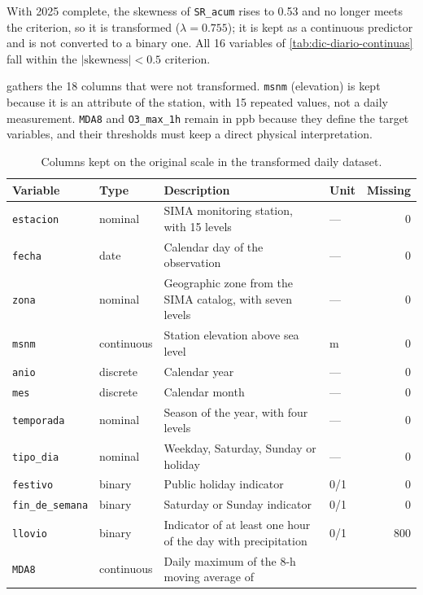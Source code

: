 With 2025 complete, the skewness of \texttt{SR\_acum} rises to 0.53 and no
longer meets the criterion, so it is transformed ($\lambda=0.755$); it is
kept as a continuous predictor and is not converted to a binary one. All 16
variables of \cref{tab:dic-diario-continuas} fall within the
$|\mathrm{skewness}|<0.5$ criterion.

 gathers the 18 columns that were not
transformed. \texttt{msnm} (elevation) is kept because it is an attribute of
the station, with 15 repeated values, not a daily measurement. \texttt{MDA8}
and \texttt{O3\_max\_1h} remain in ppb because they define the target
variables, and their thresholds must keep a direct physical interpretation.

\begin{table}[pos=t]
  \centering
  \caption{Columns kept on the original scale in the transformed daily
    dataset.}
  \label{tab:dic-diario-originales}
  \footnotesize
  \setlength{\tabcolsep}{4pt}
  \begin{tabular}{llp{8.0cm}lr}
    \toprule
    Variable & Type & Description & Unit & Missing \\
    \midrule
    \texttt{estacion} & nominal & SIMA monitoring station, with 15 levels
      & --- & 0 \\
    \texttt{fecha} & date & Calendar day of the observation
      & --- & 0 \\
    \texttt{zona} & nominal & Geographic zone from the SIMA catalog, with seven
      levels & --- & 0 \\
    \texttt{msnm} & continuous & Station elevation above sea level
      & m & 0 \\
    \texttt{anio} & discrete & Calendar year
      & --- & 0 \\
    \texttt{mes} & discrete & Calendar month
      & --- & 0 \\
    \texttt{temporada} & nominal & Season of the year, with four levels
      & --- & 0 \\
    \texttt{tipo\_dia} & nominal & Weekday, Saturday, Sunday or holiday
      & --- & 0 \\
    \texttt{festivo} & binary & Public holiday indicator
      & 0/1 & 0 \\
    \texttt{fin\_de\_semana} & binary & Saturday or Sunday indicator
      & 0/1 & 0 \\
    \texttt{llovio} & binary & Indicator of at least one hour of the day with
      precipitation & 0/1 & 800 \\
    \texttt{MDA8} & continuous & Daily maximum of the 8-h moving average of

\end{tabular}
\end{table}

